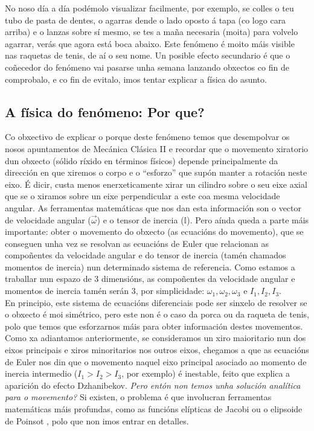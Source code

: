 \begin{refsection}
\begin{multicols}{2}
No noso día a día podémolo visualizar facilmente, por exemplo, se colles o teu
tubo de pasta de dentes, o agarras dende o lado oposto á tapa (co logo cara
arriba) e o lanzas sobre sí mesmo, se tes a maña necesaria (moita) para volvelo
agarrar, verás que agora está boca abaixo. Este fenómeno é moito máis visible
nas raquetas de tenis, de aí o seu nome. Un posible efecto secundario é que o
coñecedor do fenómeno vai pasarse unha semana lanzando obxectos co fin de
comprobalo, e co fin de evitalo, imos tentar explicar a física do asunto.


\subsection*{A física do fenómeno: Por que?}

Co obxectivo de explicar o porque deste fenómeno temos que desempolvar os nosos
apuntamentos de Mecánica Clásica II e recordar que o movemento xiratorio dun
obxecto (sólido ríxido en términos físicos) depende principalmente da dirección
en que xiremos o corpo e o ``esforzo'' que supón manter a rotación neste eixo.
É dicir, custa menos enerxeticamente xirar un cilindro sobre o seu eixe axial
que se o xiramos sobre un eixe perpendicular a este coa mesma velocidade
angular. As ferramentas matemáticas que nos dan esta información son o vector
de velocidade angular ($\vec{\omega}$) e o tensor de inercia ($\mathbb{I}$).
Pero aínda queda a parte máis importante: obter o movemento do obxecto (as
ecuacións do movemento), que se conseguen unha vez se resolvan as ecuacións de
Euler que relacionan as compoñentes da velocidade angular e do tensor de
inercia (tamén chamados momentos de inercia) nun determinado sistema de
referencia. Como estamos a traballar nun espazo de 3 dimensións, as compoñentes
da velocidade angular e momentos de inercia tamén serán 3, por simplicidade:
$\omega_1, \omega_2, \omega_3$ e $I_1, I_2, I_3$.\\

En principio, este sistema de ecuacións diferenciais pode ser sinxelo de
resolver se o obxecto é moi simétrico, pero este non é o caso da porca ou da
raqueta de tenis, polo que temos que esforzarnos máis para obter información
destes movementos. Como xa adiantamos anteriormente, se consideramos un xiro
maioritario nun dos eixos principais e xiros minoritarios nos outros eixos,
chegamos a que as ecuacións de Euler nos din que o movemento naquel eixo
principal asociado ao momento de inercia intermedio ($I_1>I_2>I_3$, por
exemplo) é inestable, feito que explica a aparición do efecto Dzhanibekov.
\textit{Pero entón non temos unha solución analítica para o movemento?} Si
existen, o problema é que involucran ferramentas matemáticas máis profundas,
como as funcións elípticas de Jacobi \cite{RouthDynamics} ou o elipsoide de
Poinsot \cite{VanDamme2017}, polo que non imos entrar en detalles.


\end{multicols}
\end{refsection}
